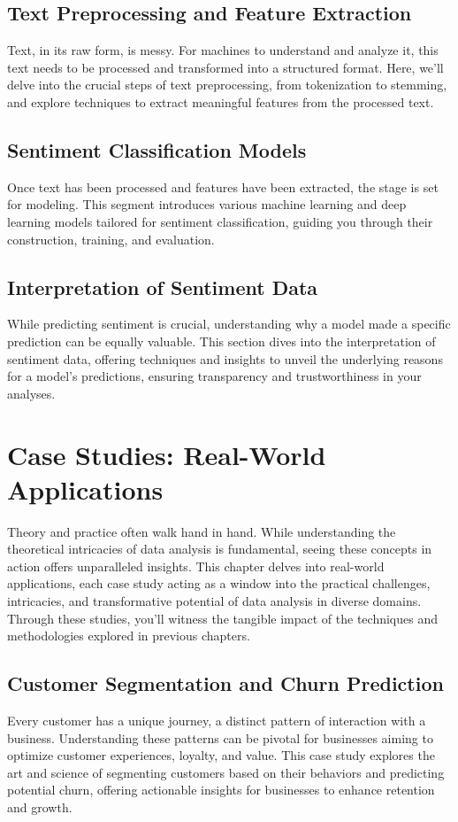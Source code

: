 \documentclass{book}
\begin{document}
\section{Text Preprocessing and Feature Extraction}
Text, in its raw form, is messy. For machines to understand and analyze it, this text needs to be processed and transformed into a structured format. Here, we'll delve into the crucial steps of text preprocessing, from tokenization to stemming, and explore techniques to extract meaningful features from the processed text.

\section{Sentiment Classification Models}
Once text has been processed and features have been extracted, the stage is set for modeling. This segment introduces various machine learning and deep learning models tailored for sentiment classification, guiding you through their construction, training, and evaluation.

\section{Interpretation of Sentiment Data}
While predicting sentiment is crucial, understanding why a model made a specific prediction can be equally valuable. This section dives into the interpretation of sentiment data, offering techniques and insights to unveil the underlying reasons for a model's predictions, ensuring transparency and trustworthiness in your analyses.

\chapter{Case Studies: Real-World Applications}
Theory and practice often walk hand in hand. While understanding the theoretical intricacies of data analysis is fundamental, seeing these concepts in action offers unparalleled insights. This chapter delves into real-world applications, each case study acting as a window into the practical challenges, intricacies, and transformative potential of data analysis in diverse domains. Through these studies, you'll witness the tangible impact of the techniques and methodologies explored in previous chapters.

\section{Customer Segmentation and Churn Prediction}
Every customer has a unique journey, a distinct pattern of interaction with a business. Understanding these patterns can be pivotal for businesses aiming to optimize customer experiences, loyalty, and value. This case study explores the art and science of segmenting customers based on their behaviors and predicting potential churn, offering actionable insights for businesses to enhance retention and growth.
\end{document}
